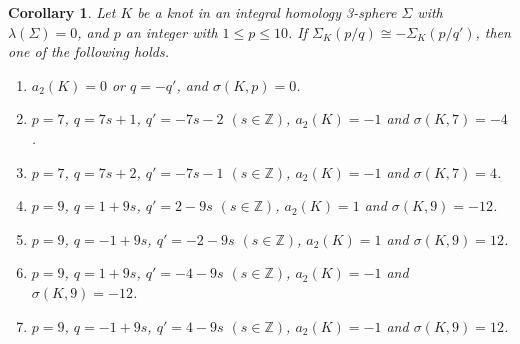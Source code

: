 \documentclass{amsart}
\newtheorem{corollary}[theorem]{Corollary}
\theoremstyle{remark}
\theoremstyle{definition}
\begin{document}
\begin{corollary}\label{cor:smallp}
Let $K$ be a knot in an integral homology 3-sphere $\Sigma$  with $\lambda(\Sigma)=0$, and $p$ an integer with $1 \leq p \leq 10$. 
If $ \Sigma_{K}(p\slash q) \cong -\Sigma_{K}(p\slash q')$, 
then one of the following holds.
\begin{enumerate}
\item $a_{2}(K)=0$ or $q=-q'$, and $\sigma(K,p)=0$.
\item $p=7$, $q=7s+1$, $q'=-7s-2$  $(s\in \mathbb{Z})$, $a_{2}(K)=-1$ and $\sigma(K,7)=-4$.

\item $p=7$, $q=7s+2$, $q'=-7s-1$  $(s\in \mathbb{Z})$, $a_{2}(K)=-1$ and $\sigma(K,7)=4$.

\item $p=9$, $q=1+9s$, $q'=2-9s$  $(s\in \mathbb{Z})$, $a_{2}(K)=1$ and 
$\sigma(K,9)=-12$.

\item $p=9$, $q=-1+9s$, $q'=-2-9s$ $(s\in \mathbb{Z})$, $a_{2}(K)=1$ and  $\sigma(K,9)=12$.

\item $p=9$, $q=1+9s$, $q'=-4-9s$  $(s\in \mathbb{Z})$, $a_{2}(K)=-1$ and $\sigma(K,9)=-12$.

\item $p=9$, $q=-1+9s$, $q'=4-9s$  $(s\in \mathbb{Z})$, $a_{2}(K)=-1$ and $\sigma(K,9)=12$.
\end{enumerate}
\end{corollary}
\end{document}
